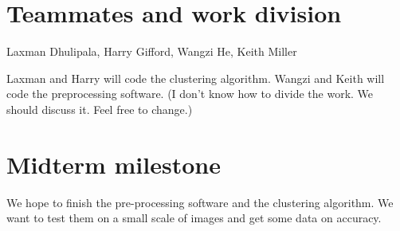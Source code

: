 \documentclass[11pt]{article}
\begin{document}
\section*{Teammates and work division}
Laxman Dhulipala, Harry Gifford, Wangzi He, Keith Miller

Laxman and Harry will code the clustering algorithm. Wangzi and Keith will code the preprocessing software. (I don't know how to divide the work. We should discuss it. Feel free to change.)

\section*{Midterm milestone}
We hope to finish the pre-processing software and the clustering algorithm. We want to test them on a small scale of images and get some data on accuracy. 
\end{document}

